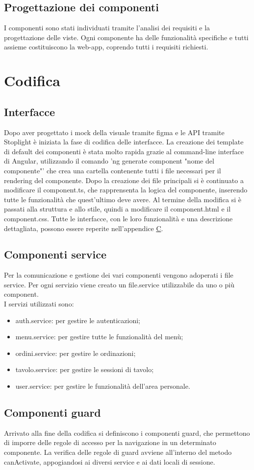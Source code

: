\subsection{Progettazione dei componenti}
I componenti sono stati individuati tramite l'analisi dei requisiti e la progettazione delle viste. Ogni componente ha delle funzionalità specifiche e tutti assieme costituiscono la web-app, coprendo tutti i requisiti richiesti.
\\
\section{Codifica}
\subsection{Interfacce}
Dopo aver progettato i mock della visuale tramite figma e le API tramite Stoplight è iniziata la fase di codifica delle interfacce. La creazione dei template di default dei componenti è stata molto rapida grazie al command-line interface di Angular, utilizzando il comando 'ng generate component "nome del componente"' che crea una cartella contenente tutti i file necessari per il rendering del componente. Dopo la creazione dei file principali si è continuato a modificare il component.ts, che rapprensenta la logica del componente, inserendo tutte le funzionalità che quest'ultimo deve avere. Al termine della modifica si è passati alla struttura e allo stile, quindi a modificare il component.html e il component.css.
Tutte le interfacce, con le loro funzionalità e una descrizione dettagliata, possono essere reperite nell'appendice {\hyperref[cap:appendice c]{C}}.
\subsection{Componenti service}
Per la comunicazione e gestione dei vari componenti vengono adoperati i file service. Per ogni servizio viene creato un file.service utilizzabile da uno o più component.\\
I servizi utilizzati sono:
\begin{itemize}
    \item auth.service: per gestire le autenticazioni;
    \item menu.service: per gestire tutte le funzionalità del menù;
    \item ordini.service: per gestire le ordinazioni;
    \item tavolo.service: per gestire le sessioni di tavolo;
    \item user.service: per gestire le funzionalità dell'area personale.
\end{itemize}
\subsection{Componenti guard}
Arrivato alla fine della codifica si definiscono i componenti guard, che permettono di imporre delle regole di accesso per la navigazione in un determinato componente. La verifica delle regole di guard avviene all'interno del metodo canActivate, appogiandosi ai diversi service e ai dati locali di sessione.